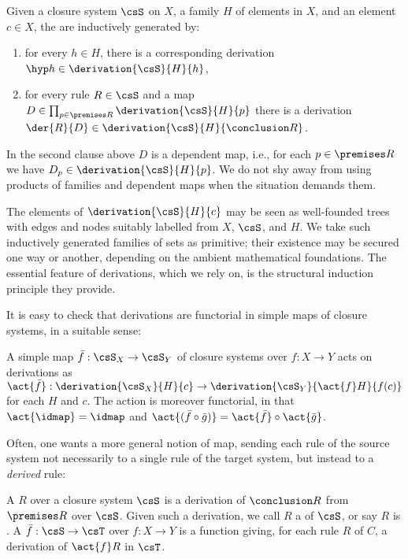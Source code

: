 \begin{definition}
  \label{def:closure-system-derivation}%
  Given a closure system $\csS$ on $X$, a family $H$ of elements in $X$, and an element $c \in X$, the
   are inductively generated
  by:
  \begin{enumerate}
  \item for every $h \in H$, there is a corresponding derivation $\hyp h \in \derivation{\csS}{H}{h}$,
  \item for every rule $R \in \csS$ and a map $D \in \prod_{p \in \premises R} \derivation{\csS}{H}{p}$ there is a derivation $\der{R}{D} \in \derivation{\csS}{H}{\conclusion R}$.
  \end{enumerate}
\end{definition}

In the second clause above $D$ is a dependent map, i.e., for each $p \in \premises R$ we have $D_p \in \derivation{\csS}{H}{p}$.
%
We do not shy away from using products of families and dependent maps when the situation demands them.

The elements of $\derivation{\csS}{H}{c}$ may be seen as well-founded trees with edges and nodes suitably labelled from $X$, $\csS$, and $H$.
%
We take such inductively generated families of sets as primitive;
%
their existence may be secured one way or another, depending on the ambient mathematical foundations.
%
The essential feature of derivations, which we rely on, is the structural induction principle they provide.

It is easy to check that derivations are functorial in simple maps of closure systems, in a suitable sense:
%
\begin{propositionwithqed}
  A simple map $\bar{f} : \csS_X \to \csS_Y$ of closure systems over $f : X \to Y$ acts on derivations as $\act{\bar{f}} : \derivation{\csS_X}{H}{c} \to \derivation{\csS_Y}{\act{f}H}{f(c)}$ for each $H$ and $c$.
  The action is moreover functorial, in that $\act{\idmap} = \idmap$ and $\act{(\bar{f} \circ \bar{g})} = \act{\bar{f}} \circ \act{\bar{g}}$.
\end{propositionwithqed}

Often, one wants a more general notion of map, sending each rule of the source system not necessarily to a single rule of the target system, but instead to a \emph{derived} rule:

\begin{definition}
  \label{def:derivation-grafting}%
  A  $R$ over a closure system $\csS$ is a derivation of $\conclusion R$ from $\premises R$ over $\csS$.
  Given such a derivation, we call $R$ a  of $\csS$, or say $R$ is .
  A  $\bar{f} : \csS \to \csT$ over $f : X \to Y$ is a function giving, for each rule $R$ of $C$, a derivation of $\act{f}R$ in $\csT$.
\end{definition}

